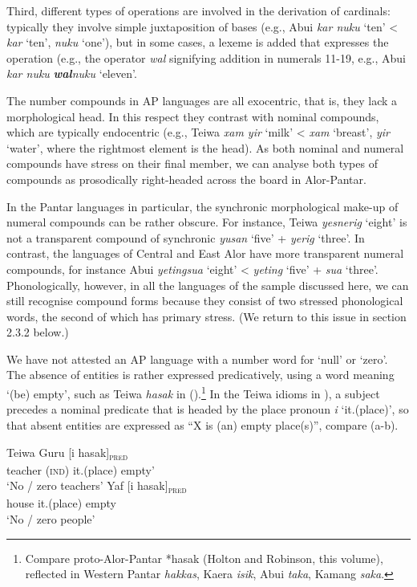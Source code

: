 Third, different types of operations are involved in the derivation of cardinals: typically they involve simple juxtaposition of bases (e.g., Abui \textit{kar nuku} `ten' {\textless} \textit{kar} `ten', \textit{nuku} `one'), but in some cases, a lexeme is added that expresses the operation (e.g., the operator \textit{wal} signifying addition in numerals 11-19, e.g., Abui \textit{kar nuku} \textbf{\textit{wal}}\textit{nuku} `eleven'.

The number compounds in AP languages are all exocentric, that is, they lack a morphological head. In this respect they contrast with nominal compounds, which are typically endocentric (e.g., Teiwa \textit{xam yir} `milk' {\textless} \textit{xam} `breast', \textit{yir} `water', where the rightmost element is the head). As both nominal and numeral compounds have stress on their final member, we can analyse both types of compounds as prosodically right-headed across the board in Alor-Pantar.

In the Pantar languages in particular, the synchronic morphological make-up of numeral compounds can be rather obscure. For instance, Teiwa \textit{yesnerig} `eight' is not a transparent compound of synchronic \textit{yusan} `five' + \textit{yerig} `three'. In contrast, the languages of Central and East Alor have more transparent numeral compounds, for instance Abui \textit{yetingsua} `eight' {\textless} \textit{yeting} `five' + \textit{sua} `three'. Phonologically, however, in all the languages of the sample discussed here, we can still recognise compound forms because they consist of two stressed phonological words, the second of which has primary stress. (We return to this issue in section 2.3.2 below.)

We have not attested an AP language with a number word for `null' or `zero'. The absence of entities is rather expressed predicatively, using a word meaning `(be) empty', such as Teiwa \textit{hasak} in ().\footnote{{}  Compare proto-Alor-Pantar *hasak (Holton and Robinson, this volume), reflected in Western Pantar \textit{hakkas}, Kaera \textit{isik}, Abui \textit{taka}, Kamang \textit{saka}.} In the Teiwa idioms in ), a subject precedes a nominal predicate that is headed by the place pronoun \textit{i} `it.(place)', so that absent entities are expressed as ``X is (an) empty place(s)'', compare (a-b).


\ea%
\label{bkm:Ref355363568}
Teiwa
\ea
\gll Guru       [i     hasak]\textsc{\textsubscript{pred}} \\
     teacher \textsc{(ind)}   it.(place)    empty'  \\
\glt  `No / zero teachers'
\ex
\gll Yaf [i     hasak]\textsc{\textsubscript{pred}} \\
    house      it.(place)   empty\\
    `No / zero people'
\z
\z

